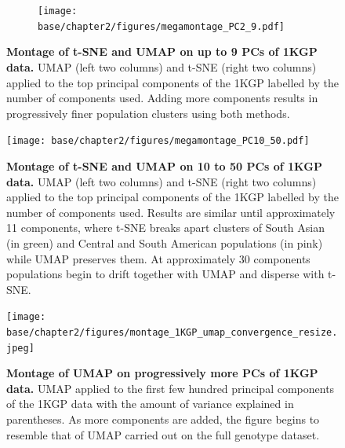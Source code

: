 \begin{figure}[ht]
    \centering
    \begin{subfigure}{\textwidth}
    \texttt{[image: base/chapter2/figures/megamontage\_PC2\_9.pdf]}
    \end{subfigure}
    \caption[Montage of t-SNE and UMAP on up to 9 PCs of 1KGP data]{\textbf{Montage of t-SNE and UMAP on up to 9 PCs of 1KGP data.} UMAP (left two columns) and t-SNE (right two columns) applied to the top principal components of the 1KGP labelled by the number of components used. Adding more components results in progressively finer population clusters using both methods.}
    \label{fig:supp_megamontage_pc2_9}  
\end{figure}

\newpage

\begin{figure}[ht]
    \centering
    \texttt{[image: base/chapter2/figures/megamontage\_PC10\_50.pdf]}
    \caption[Montage of t-SNE and UMAP on 10 to 50 PCs of 1KGP data]{\textbf{Montage of t-SNE and UMAP on 10 to 50 PCs of 1KGP data.} UMAP (left two columns) and t-SNE (right two columns) applied to the top principal components of the 1KGP labelled by the number of components used. Results are similar until approximately 11 components, where t-SNE breaks apart clusters of South Asian (in green) and Central and South American populations (in pink) while UMAP preserves them. At approximately 30 components populations begin to drift together with UMAP and disperse with t-SNE.}
    \label{fig:supp_megamontage_pc10_50}
\end{figure}

\newpage

\begin{figure}[ht]
    \centering
    \texttt{[image: base/chapter2/figures/montage\_1KGP\_umap\_convergence\_resize.jpeg]}
    \caption[Montage of UMAP on progressively more PCs of 1KGP data]{\textbf{Montage of UMAP on progressively more PCs of 1KGP data.} UMAP applied to the first few hundred principal components of the 1KGP data with the amount of variance explained in parentheses. As more components are added, the figure begins to resemble that of UMAP carried out on the full genotype dataset.}
    \label{fig:supp_montage_1kgp_converge}
\end{figure}

